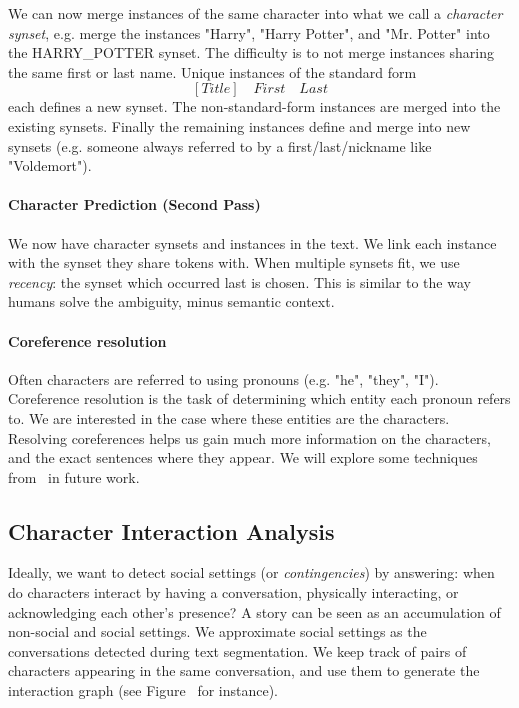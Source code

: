\documentclass[twoside]{article}
\makeatletter
\let\ref\@refstar
\makeatother
\begin{document}
\begin{multicols}{2}
We can now merge instances of the same character into what we call a \emph{character synset},  e.g. merge the instances "Harry", "Harry Potter", and "Mr. Potter" into the HARRY\_POTTER synset. The difficulty is to not merge instances sharing the same first or last name. Unique instances of the standard form
$$[Title]\quad First \quad Last$$
each defines a new synset. The non-standard-form instances are merged into the existing synsets. Finally the remaining instances define and merge into new synsets (e.g. someone always referred to by a first/last/nickname like "Voldemort"). 

\paragraph{Character Prediction (Second Pass)} We now have character synsets and instances in the text. We link each instance with the synset they share tokens with. When multiple synsets fit, we use \emph{recency}: the synset which occurred last is chosen. This is similar to the way humans solve the ambiguity, minus semantic context.

\paragraph{Coreference resolution} Often characters are referred to using pronouns (e.g. "he", "they", "I"). Coreference resolution is the task of determining which entity each pronoun refers to. We are interested in the case where these entities are the characters. Resolving coreferences helps us gain much more information on the characters, and the exact sentences where they appear. We will explore some techniques from~\cite{soon2001machine} in future work.


\subsection{Character Interaction Analysis}

Ideally, we want to detect social settings (or \textit{contingencies}) by answering: when do characters interact by having a conversation, physically interacting, or acknowledging each other's presence? A story can be seen as an accumulation of non-social and social settings. We approximate social settings as the conversations detected during text segmentation. We keep track of pairs of characters appearing in the same conversation, and use them to generate the interaction graph (see Figure~\ref{figure:gatsby_graph} for instance).


\end{multicols}
\end{document}
